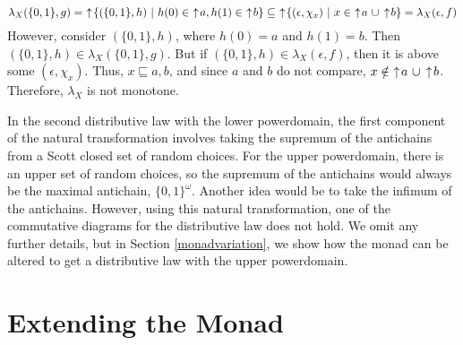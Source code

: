 \[\lambda_X (\{0,1\},g) = \,\,\uparrow\! \{(\{0,1\},h)\ |\ h(0)\in\, \,\uparrow\! a, h(1)\in\, \,\uparrow\! b\} \subseteq\, \,\uparrow\! \{(\epsilon, \chi_x)\ |\ x\in\, \,\uparrow\! a\ \cup \,\uparrow\! b\} = \lambda_X (\epsilon, f)\]
However, consider $(\{0,1\}, h)$, where $h(0)=a$ and $h(1)=b$.  Then $(\{0,1\}, h) \in \lambda_X (\{0,1\},g)$.  But if $(\{0,1\}, h) \in \lambda_X (\epsilon, f)$, then it is above some $(\epsilon, \chi_x)$.  Thus, $x\sqsubseteq a,b$, and since $a$ and $b$ do not compare, $x\notin\, \,\uparrow\! a\ \cup \,\uparrow\! b$.  Therefore, $\lambda_X$ is not monotone.

In the second distributive law with the lower powerdomain, the first component of the natural transformation involves taking the supremum of the antichains from a Scott closed set of random choices.  For the upper powerdomain, there is an upper set of random choices, so the supremum of the antichains would always be the maximal antichain, $\{0,1\}^\omega$.  Another idea would be to take the infimum of the antichains.  However, using this natural transformation, one of the commutative diagrams for the distributive law does not hold.  We omit any further details, but in Section \ref{monadvariation}, we show how the monad can be altered to get a distributive law with the upper powerdomain.

\section{Extending the Monad}

